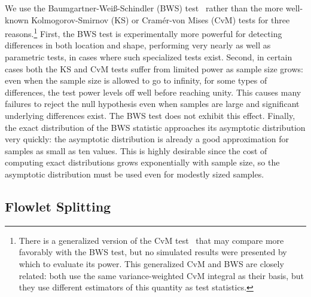 \documentclass[conference]{IEEEtran}
\newcommand{\caps}[1]{{\small{#1}}}
\begin{document}
We use the Baumgartner-Wei\ss-Schindler (\caps{BWS}) test~\cite{BWS98} rather than the more well-known Kolmogorov-Smirnov (\caps{KS}) or Cram\'er-von Mises (\caps{CvM}) tests for three reasons.\footnote{There is a generalized version of the CvM test~\cite{Pettitt79} that may compare more favorably with the BWS test, but no simulated results were presented by which to evaluate its power. This generalized CvM and BWS are closely related: both use the same variance-weighted CvM integral as their basis, but they use different estimators of this quantity as test statistics.} First, the \caps{BWS} test is experimentally more powerful for detecting differences in both location and shape, performing very nearly as well as parametric tests, in cases where such specialized tests exist. Second, in certain cases both the \caps{KS} and \caps{CvM} tests suffer from limited power as sample size grows: even when the sample size is allowed to go to infinity, for some types of differences, the test power levels off well before reaching unity. This causes many failures to reject the null hypothesis even when samples are large and significant underlying differences exist. The \caps{BWS} test does not exhibit this effect. Finally, the exact distribution of the \caps{BWS} statistic approaches its asymptotic distribution very quickly: the asymptotic distribution is already a good approximation for samples as small as ten values. This is highly desirable since the cost of computing exact distributions grows exponentially with sample size, so the asymptotic distribution must be used even for modestly sized samples.


\subsection{Flowlet Splitting}
\end{document}

